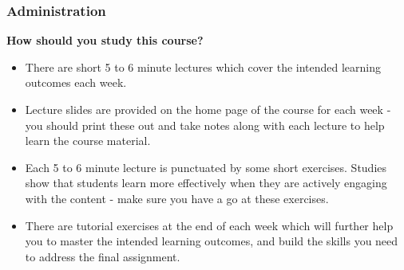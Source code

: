 \documentclass{beamer}
\begin{document}
\begin{frame}
\frametitle{Administration}
\textbf{How should you study this course?}
\begin{itemize}
\item There are short 5 to 6 minute lectures which cover the intended learning outcomes each week.
\item Lecture slides are provided on the home page of the course for each week - you should print these out and take notes along with each lecture to help learn the course material.
\item Each 5 to 6 minute lecture is punctuated by some short exercises. Studies show that students learn more effectively when they are actively engaging with the content - make sure you have a go at these exercises.
\item There are tutorial exercises at the end of each week which will further help you to master the intended learning outcomes, and build the skills you need to address the final assignment.
\end{itemize}
\end{frame}
\end{document}
